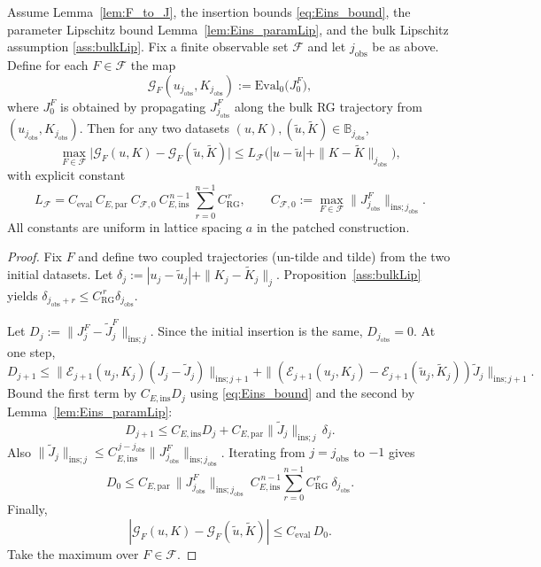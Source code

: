 \begin{theorem}\label{thm:C3_4}
Assume Lemma~\ref{lem:F_to_J}, the insertion bounds \eqref{eq:Eins_bound}, the parameter Lipschitz bound Lemma~\ref{lem:Eins_paramLip},
and the bulk Lipschitz assumption \ref{ass:bulkLip}.
Fix a finite observable set $\mathcal F$ and let $j_{\mathrm{obs}}$ be as above.
Define for each $F\in\mathcal F$ the map
\[
\mathcal G_F(u_{j_{\mathrm{obs}}},K_{j_{\mathrm{obs}}})
:=\mathrm{Eval}_0\big(J^{F}_{0}\big),
\]
where $J^{F}_0$ is obtained by propagating $J^F_{j_{\mathrm{obs}}}$ along the bulk RG trajectory from $(u_{j_{\mathrm{obs}}},K_{j_{\mathrm{obs}}})$.
Then for any two datasets $(u,K),(\widetilde u,\widetilde K)\in\mathbb B_{j_{\mathrm{obs}}}$,
\begin{equation}\label{eq:mainLip}
\max_{F\in\mathcal F}\big|\mathcal G_F(u,K)-\mathcal G_F(\widetilde u,\widetilde K)\big|
\le
L_{\mathcal F}\Big(|u-\widetilde u|+\|K-\widetilde K\|_{j_{\mathrm{obs}}}\Big),
\end{equation}
with explicit constant
\begin{equation}\label{eq:L_F}
L_{\mathcal F}
=
C_{\mathrm{eval}}\ C_{E,\mathrm{par}}\ C_{\mathcal F,0}\ C_{E,\mathrm{ins}}^{\,n-1}\ \sum_{r=0}^{n-1} C_{\mathrm{RG}}^{\,r},
\qquad
C_{\mathcal F,0}:=\max_{F\in\mathcal F}\|J^F_{j_{\mathrm{obs}}}\|_{\mathrm{ins};j_{\mathrm{obs}}}.
\end{equation}
All constants are uniform in lattice spacing $a$ in the patched construction.
\end{theorem}

\begin{proof}
Fix $F$ and define two coupled trajectories (un-tilde and tilde) from the two initial datasets.
Let $\delta_j:=|u_j-\widetilde u_j|+\|K_j-\widetilde K_j\|_j$.
Proposition~\ref{ass:bulkLip} yields $\delta_{j_{\mathrm{obs}}+r}\le C_{\mathrm{RG}}^{\,r}\delta_{j_{\mathrm{obs}}}$.

Let $D_j:=\|J^F_j-\widetilde J^F_j\|_{\mathrm{ins};j}$. Since the initial insertion is the same, $D_{j_{\mathrm{obs}}}=0$.
At one step,
\[
D_{j+1}
\le
\|\mathcal E_{j+1}(u_j,K_j)(J_j-\widetilde J_j)\|_{\mathrm{ins};j+1}
+
\|(\mathcal E_{j+1}(u_j,K_j)-\mathcal E_{j+1}(\widetilde u_j,\widetilde K_j))\widetilde J_j\|_{\mathrm{ins};j+1}.
\]
Bound the first term by $C_{E,\mathrm{ins}}D_j$ using \eqref{eq:Eins_bound} and the second by Lemma~\ref{lem:Eins_paramLip}:
\[
D_{j+1}\le C_{E,\mathrm{ins}}D_j + C_{E,\mathrm{par}}\|\widetilde J_j\|_{\mathrm{ins};j}\,\delta_j.
\]
Also $\|\widetilde J_j\|_{\mathrm{ins};j}\le C_{E,\mathrm{ins}}^{\,j-j_{\mathrm{obs}}} \|J^F_{j_{\mathrm{obs}}}\|_{\mathrm{ins};j_{\mathrm{obs}}}$.
Iterating from $j=j_{\mathrm{obs}}$ to $-1$ gives
\[
D_0 \le C_{E,\mathrm{par}}\,\|J^F_{j_{\mathrm{obs}}}\|_{\mathrm{ins};j_{\mathrm{obs}}}\ C_{E,\mathrm{ins}}^{\,n-1}\sum_{r=0}^{n-1} C_{\mathrm{RG}}^{\,r}\ \delta_{j_{\mathrm{obs}}}.
\]
Finally,
\[
|\mathcal G_F(u,K)-\mathcal G_F(\widetilde u,\widetilde K)|
\le C_{\mathrm{eval}}\,D_0.
\]
Take the maximum over $F\in\mathcal F$.
\end{proof}

